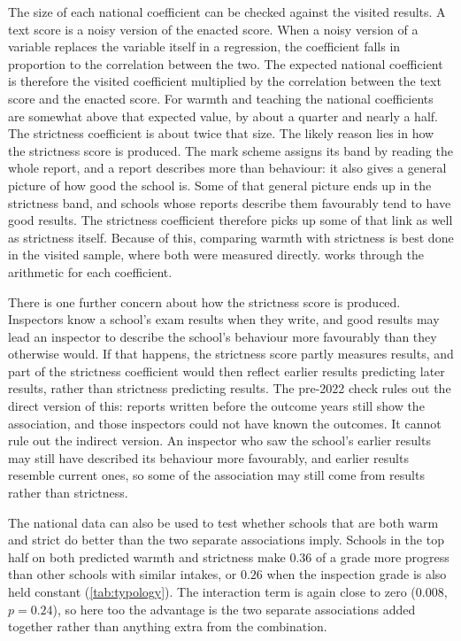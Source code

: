 The size of each national coefficient can be checked against the visited results. A text score is a noisy version of the enacted score. When a noisy version of a variable replaces the variable itself in a regression, the coefficient falls in proportion to the correlation between the two. The expected national coefficient is therefore the visited coefficient multiplied by the correlation between the text score and the enacted score. For warmth and teaching the national coefficients are somewhat above that expected value, by about a quarter and nearly a half. The strictness coefficient is about twice that size. The likely reason lies in how the strictness score is produced. The mark scheme assigns its band by reading the whole report, and a report describes more than behaviour: it also gives a general picture of how good the school is. Some of that general picture ends up in the strictness band, and schools whose reports describe them favourably tend to have good results. The strictness coefficient therefore picks up some of that link as well as strictness itself. Because of this, comparing warmth with strictness is best done in the visited sample, where both were measured directly.  works through the arithmetic for each coefficient.

There is one further concern about how the strictness score is produced. Inspectors know a school's exam results when they write, and good results may lead an inspector to describe the school's behaviour more favourably than they otherwise would. If that happens, the strictness score partly measures results, and part of the strictness coefficient would then reflect earlier results predicting later results, rather than strictness predicting results. The pre-2022 check rules out the direct version of this: reports written before the outcome years still show the association, and those inspectors could not have known the outcomes. It cannot rule out the indirect version. An inspector who saw the school's earlier results may still have described its behaviour more favourably, and earlier results resemble current ones, so some of the association may still come from results rather than strictness.

The national data can also be used to test whether schools that are both warm and strict do better than the two separate associations imply. Schools in the top half on both predicted warmth and strictness make $0.36$ of a grade more progress than other schools with similar intakes, or $0.26$ when the inspection grade is also held constant (\cref{tab:typology}). The interaction term is again close to zero ($0.008$, $p = 0.24$), so here too the advantage is the two separate associations added together rather than anything extra from the combination.

